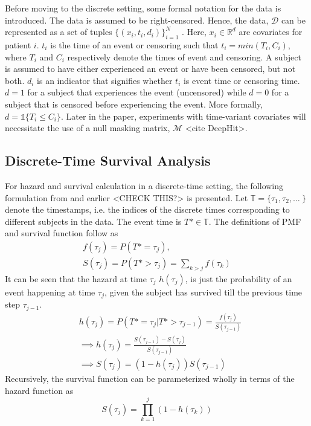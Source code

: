 \documentclass[%
 reprint,
 amsmath,amssymb,
 aps,
]{revtex4-2}
\begin{document}
Before moving to the discrete setting, some formal notation for the data is introduced. The data is assumed to be right-censored. Hence, the data, $\mathcal{D}$ can be represented as a set of tuples $\{(x_i , t_i , d_i)\}_{i=1}^{N}$  \cite{nagpal_deep_2021}. Here, $x_i \in \mathbb{R}^d$ are covariates for patient $i$. $t_i$ is the time of an event or censoring such that $t_i = min(T_i, C_i)$, where $T_i$ and $C_i$ respectively denote the times of event and censoring. A subject is assumed to have either experienced an event or have been censored, but not both. $d_i$ is an indicator that signifies whether $t_i$ is event time or censoring time. $d=1$ for a subject that experiences the event (uncensored) while $d=0$ for a subject that is censored before experiencing the event. More formally, $d= \mathbb{1}\{T_i \le C_i\}$. Later in the paper, experiments with time-variant covariates will necessitate the use of a null masking matrix, $\mathcal{M}$ <cite DeepHit>.\\

\subsection{\label{discrete}Discrete-Time Survival Analysis}
For hazard and survival calculation in a discrete-time setting, the following formulation from \cite{kvamme_continuous_2019} and earlier \cite{Gensheimer_Narasimhan_2019}<CHECK THIS?> is presented. Let $\mathbb{T} = \{\tau_1, \tau_2, \ldots\ \}$ denote the timestamps, i.e. the indices of the discrete times corresponding to different subjects in the data. The event time is $T*\in\mathbb{T}$. The definitions of PMF and survival function follow as
\begin{gather*}
f(\tau_j) = P(T* = \tau_j),\\
S(\tau_j) = P(T* >\tau_j) = \sum_{k>j}f(\tau_k)
\end{gather*}
It can be seen that the hazard at time $\tau_j$ $h(\tau_j)$, is just the probability of an event happening at time $\tau_j$, given the subject has survived till the previous time step $\tau_{j-1}$. 
\begin{align}
&h(\tau_j) = P(T* = \tau_j | T* > \tau_{j-1}) = \frac{f(\tau_j)}{S(\tau_{j-1})} \label{haz_cond_proba}\\
&\implies  h(\tau_j) = \frac{S(\tau_{j-1}) - S(\tau_j)}{S(\tau_{j-1})}\\
&\implies S(\tau_j) = (1 - h(\tau_j))S(\tau_{j-1})
\end{align}
Recursively, the survival function can be parameterized wholly in terms of the hazard function as
\[
S(\tau_j) = \prod_{k=1}^{j}(1 - h(\tau_k))
\]
\end{document}
